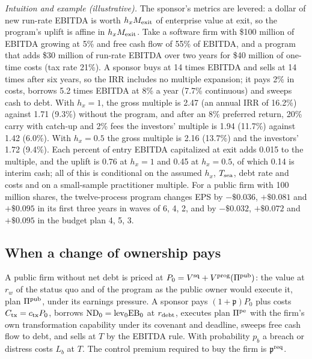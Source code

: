 \noindent\emph{Intuition and example (illustrative).} The sponsor's metrics are levered: a dollar of new run-rate EBITDA is worth $h_xM_{\rm exit}$ of enterprise value at exit, so the program's uplift is affine in $h_xM_{\rm exit}$. Take a software firm with \$100 million of EBITDA growing at 5\% and free cash flow of 55\% of EBITDA, and a program that adds \$30 million of run-rate EBITDA over two years for \$40 million of one-time costs (tax rate 21\%). A sponsor buys at 14 times EBITDA and sells at 14 times after six years, so the IRR includes no multiple expansion; it pays 2\% in costs, borrows 5.2 times EBITDA at 8\% a year (7.7\% continuous) and sweeps cash to debt. With $h_x=1$, the gross multiple is 2.47 (an annual IRR of 16.2\%) against 1.71 (9.3\%) without the program, and after an 8\% preferred return, 20\% carry with catch-up and 2\% fees the investors' multiple is 1.94 (11.7\%) against 1.42 (6.0\%). With $h_x=0.5$ the gross multiple is 2.16 (13.7\%) and the investors' 1.72 (9.4\%). Each percent of entry EBITDA capitalized at exit adds 0.015 to the multiple, and the uplift is 0.76 at $h_x=1$ and 0.45 at $h_x=0.5$, of which 0.14 is interim cash; all of this is conditional on the assumed $h_x$, $T_{\rm sea}$, debt rate and costs and on a small-sample practitioner multiple. For a public firm with 100 million shares, the twelve-process program changes EPS by $-\$0.036$, $+\$0.081$ and $+\$0.095$ in its first three years in waves of 6, 4, 2, and by $-\$0.032$, $+\$0.072$ and $+\$0.095$ in the budget plan 4, 5, 3.

\subsection{When a change of ownership pays}\label{sec:regimes-lbo}

\begin{assumption}\label{ass:reg-lbo}
A public firm without net debt is priced at $P_0=V^{\rm sq}+V^{\rm prog}(\Pi^{\rm pub})$: the value at $r_w$ of the status quo and of the program as the public owner would execute it, plan $\Pi^{\rm pub}$, under its earnings pressure. A sponsor pays $(1+\mathfrak p)P_0$ plus costs $C_{\rm tx}=c_{\rm tx}P_0$, borrows $\mathrm{ND}_0={\rm lev}_0\mathrm{EB}_0$ at $r_{\rm debt}$, executes plan $\Pi^{\rm pe}$ with the firm's own transformation capability under its covenant and deadline, sweeps free cash flow to debt, and sells at $T$ by the EBITDA rule. With probability $p_b$ a breach or distress costs $L_b$ at $T$. The control premium required to buy the firm is $\mathfrak p^{\rm req}$.
\end{assumption}

